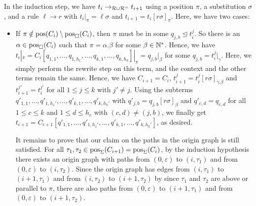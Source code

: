 \begin{myproof}
    In the induction step, we have
    $t_i \to_{\mathcal{R} \cup \mathcal{R}^{=}} t_{i+1}$ using a position $\pi$, a substitution $\sigma$, and a
    rule $\ell \to r$ with $t_i|_{\pi} = \ell \sigma$ and $t_{i+1} = t_i[r
    \sigma]_{\pi}$. Here, we have two cases:
    \begin{itemize}
        \item If $\pi \notin \mathrm{pos}(C_i) \setminus \mathrm{pos}_{\Box}(C_i)$, 
          then $\pi$ must be in some $q_{j,b} \trianglelefteq t_{i}^{j}$.
          So there is an $\alpha \in \mathrm{pos}_{\Box}(C_i)$
such that $\pi =  \alpha.\beta$ for some  $\beta \in \mathbb{N}^*$.
Hence, we have $t_i|_\pi = 
C_i[q_{1,1},\ldots,q_{1,h_1}, \ldots, q_{k,1}, \ldots, q_{k, h_k}]|_\pi = q_{j,b}|_\beta$
for some $q_{j,b} = t_i^j|_\gamma$. 
     Here, we simply perform the rewrite step on this term, and the context and the other terms remain the same.
        Hence, we have $C_{i+1} = C_{i}$, $t_{i+1}^{j} = t_i^{j}[r \sigma]_{\gamma.\beta}$ and
        $t_{i+1}^{j'} = t_i^{j'}$ for all $1 \leq j \leq k$ with $j' \neq j$.
        Using the subterms $q'_{1,1}, \ldots, q'_{1, h_1'}, \ldots,
        q'_{k,1}, \ldots, q'_{k, h_k'}$ with $q'_{j,b} = q_{j,b}[r \sigma]_{\beta}$ and
        $q'_{c,d} = q_{c,d}$ for all $1 \leq c \leq k$ and $1 \leq d \leq h_c$
        with $(c,d) \neq (j,b)$,
        we finally get $t_{i+1} = C_{i+1}[q'_{1,1}, \ldots, q'_{1, h_1'}, \ldots,
        q'_{k,1}, \ldots, q'_{k, h_k'}]$, as desired.
        
        It remains to prove that our claim on the paths in the origin graph is still satisfied.
        For all $\tau_1, \tau_2 \in \mathrm{pos}_\Sigma(C_{i+1}) = \mathrm{pos}_\Sigma(C_{i})$, by the induction
        hypothesis there
        exists an origin graph with
        paths from $(0,\varepsilon)$ to $(i, \tau_1)$ and from
$(0,\varepsilon)$ to $(i, \tau_2)$. Since the origin graph has  edges from
        $(i, \tau_1)$ to $(i+1,\tau_1)$ and from
        $(i, \tau_2)$ to $(i+1,\tau_2)$
        by  since $\tau_1$ and $\tau_2$ are above or parallel to $\pi$, 
        there are also paths from $(0,\varepsilon)$ to $(i+1, \tau_1)$ and from
        $(0,\varepsilon)$ to $(i+1, \tau_2)$.


\end{itemize}
\end{myproof}

